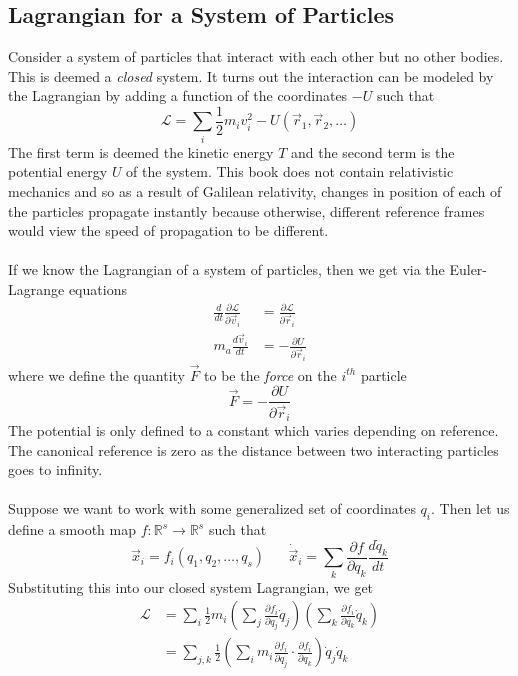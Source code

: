 \documentclass{article}
\newcommand{\pd}[2]{\frac{\partial #1}{\partial #2}}
\newcommand{\od}[2]{\frac{d #1}{d #2}}
\newcommand{\twen}{\hspace{20pt}}
\newcommand{\lagr}{\mathscr{L}}
\theoremstyle{definition}
\theoremstyle{remark}
\begin{document}
\subsection{Lagrangian for a System of Particles}
Consider a system of particles that interact with each other but no other bodies. This is deemed a \emph{closed} system. It turns out the interaction can be modeled by the Lagrangian by adding a function of the coordinates $-U$ such that 
\begin{equation}
    \lagr = \sum_i \frac{1}{2}m_i v_i^2 -U(\vec r_1,\vec r_2,\ldots)
\end{equation}
The first term is deemed the kinetic energy $T$ and the second term is the potential energy $U$ of the system. This book does not contain relativistic mechanics and so as a result of Galilean relativity, changes in position of each of the particles propagate instantly because otherwise, different reference frames would view the speed of propagation to be different.\\\\
If we know the Lagrangian of a system of particles, then we get via the Euler-Lagrange equations
\begin{equation*}
    \begin{split}
        \od{}{t}\pd{\lagr}{\vec v_i} &=\pd {\lagr}{\vec r_i} \\
        m_a \od{\vec v_i}{t} &=-\pd{U}{\vec r_i}
    \end{split}
\end{equation*}
where we define the quantity $\vec F$ to be the \emph{force} on the $i^{th}$ particle
\begin{equation*}
    \vec F= -\pd{U}{\vec r_i}
\end{equation*}
The potential is only defined to a constant which varies depending on reference. The canonical reference is zero as the distance between two interacting particles goes to infinity.\\\\
Suppose we want to work with some generalized set of coordinates $q_i$. Then let us define a smooth map $f:\mathbb{R}^s \to \mathbb{R}^s$ such that 
\begin{equation*}
    \vec x_i = f_i(q_1,q_2,\ldots,q_s) \twen \dot{ \vec {x}}_i= \sum_k \pd{f}{q_k}\od{\dot q_k}{t} 
\end{equation*}
Substituting this into our closed system Lagrangian, we get 
\begin{equation*}
    \begin{split}
        \lagr &= \sum_i\frac{1}{2} m_i \left( \sum_j\pd{f_i}{q_j}\dot q_j \right) \left( \sum_k\pd{f_i}{q_k}\dot q_k \right) \\
        &= \sum_{j,k} \frac{1}{2}\left( \sum_i m_i \pd{f_i}{q_j}\cdot \pd{f_i}{q_k} \right)\dot q_j \dot q_k
    \end{split}
\end{equation*}
\end{document}
